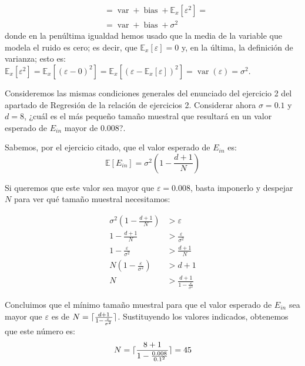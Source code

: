 \documentclass[a4paper, 11pt]{article}
\begin{document}
\begin{solucion}
\begin{align*}
              &= \operatorname{var} + \operatorname{bias} + \mathbb{E}_x[\varepsilon^2] =\\
              &= \operatorname{var} + \operatorname{bias} + \sigma^2
          \end{align*}
          donde en la penúltima igualdad hemos usado que la media de la variable que modela el ruido es cero; es decir, que $\mathbb{E}_x[\varepsilon] = 0$ y, en la última, la definición de varianza; esto es: $\mathbb{E}_x[\varepsilon^2] = \mathbb{E}_x[(\varepsilon - 0)^2] = \mathbb{E}_x[(\varepsilon - \mathbb{E}_x[\varepsilon])^2] = \operatorname{var}(\varepsilon) = \sigma^2$.
      \end{solucion}

      \begin{ejercicio}
        \item  Consideremos las mismas condiciones generales del enunciado del ejercicio 2 del apartado de Regresión de la relación de ejercicios 2.
        Considerar ahora $\sigma=0.1$ y $d=8$, ¿cuál es el más pequeño tamaño muestral que resultará en un valor esperado de $E_{in}$ mayor de $0.008$?.
      \end{ejercicio}


      \begin{solucion}
        Sabemos, por el ejercicio citado, que el valor esperado de $E_{in}$ es:
        \[
        \mathbb{E}[E_{in}] = \sigma^2\left(1 - \frac{d+1}{N}\right)
        \]

        Si queremos que este valor sea mayor que $\varepsilon = 0.008$, basta imponerlo y despejar $N$ para ver qué tamaño muestral necesitamos:

        \begin{align*}
            \sigma^2\left(1 - \frac{d+1}{N}\right) &> \varepsilon \\
            1 - \frac{d+1}{N} &> \frac{\varepsilon}{\sigma^2} \\
            1 - \frac{\varepsilon}{\sigma^2} &> \frac{d+1}{N} \\
            N \left(1 - \frac{\varepsilon}{\sigma^2}\right) &> d+1 \\
            N &> \frac{d+1}{1 - \frac{\varepsilon}{\sigma^2}}
        \end{align*}

        Concluimos que el mínimo tamaño muestral para que el valor esperado de $E_{in}$ sea mayor que $\varepsilon$ es de $N = \lceil\frac{d+1}{1 - \frac{\varepsilon}{\sigma^2}}\rceil$. Sustituyendo los valores indicados, obtenemos que este número es:
        \[
        N = \lceil\frac{8+1}{1 - \frac{0.008}{0.1^2}}\rceil = 45
        \]
      \end{solucion}
\end{document}
